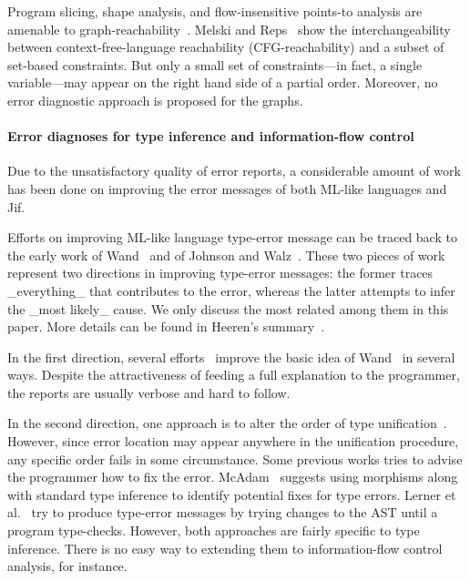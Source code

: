 Program slicing, shape analysis, and flow-insensitive points-to
analysis are amenable to graph-reachability~\cite{reps-graph}. Melski
and Reps~\cite{melski-cflgraph} show the interchangeability between
context-free-language reachability (CFG-reachability) and a subset of
set-based constraints. But only a small set of constraints---in fact,
a single variable---may appear on the right hand side of a partial
order. Moreover, no error diagnostic approach is proposed for the
graphs.

\paragraph{Error diagnoses for type inference
	    and information-flow control} 

Due to the unsatisfactory quality of error reports, a considerable
amount of work has been done on improving the error messages of both
ML-like languages and Jif.

Efforts on improving ML-like language type-error message can be
traced back to the early work of Wand~\cite{wand-errorfinding} and
of Johnson and Walz~\cite{johnson-popl86}. These two pieces of work
represent two directions in improving type-error messages: the former
traces _everything_ that contributes to the error, whereas the
latter attempts to infer the _most likely_ cause. We only discuss the
most related among them in this paper. More details can be found in
Heeren's summary~\cite{heeren:thesis}.

In the first direction, several efforts~\cite{choppella95,
haack:slicing, tip:slicing} improve the basic idea of
Wand~\cite{wand-errorfinding} in several ways. Despite the
attractiveness of feeding a full explanation to the programmer, the
reports are usually verbose and hard to follow.

In the second direction, one approach is to alter the order of type
unification~\cite{lee:toplas, mcadam:unification}. However, since
error location may appear anywhere in the unification procedure, any
specific order fails in some circumstance. Some previous works tries
to advise the programmer how to fix the error.
McAdam~\cite{mcadam:thesis} suggests using morphisms along with
standard type inference to identify potential fixes for type errors.
Lerner et al.~\cite{lerner:pldi07} try to produce type-error messages
by trying changes to the AST until a program type-checks.  However,
both approaches are fairly specific to type inference. There is no
easy way to extending them to information-flow control analysis, for
instance.


